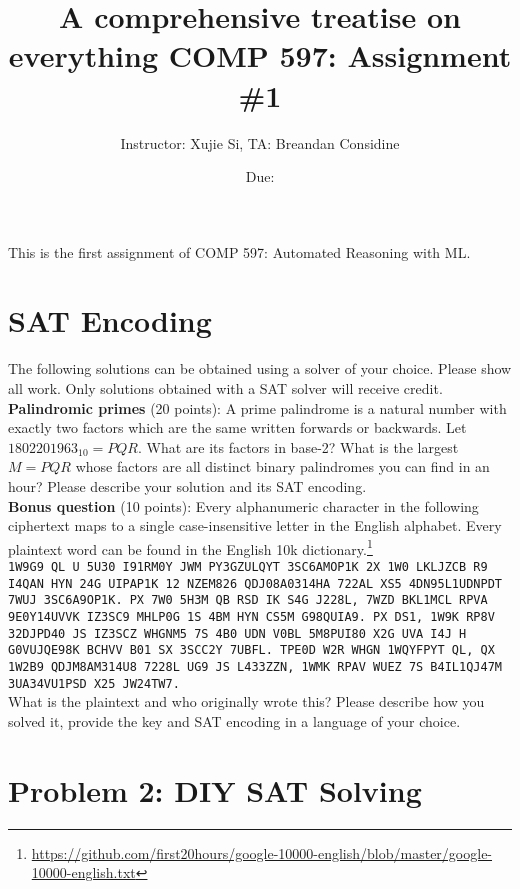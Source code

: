 \documentclass[11pt]{article}
\author{Instructor: Xujie Si, TA: Breandan Considine}
\date{Due: }
\title{A comprehensive treatise on everything\vspace{-2ex}%
}
\title{COMP 597: Assignment \#1}
\begin{document}
    \maketitle
    \noindent This is the first assignment of COMP 597: Automated Reasoning with ML.

    \section{SAT Encoding}

    The following solutions can be obtained using a solver of your choice. Please show all work. Only solutions obtained with a SAT solver will receive credit.\\

    \noindent \textbf{Palindromic primes} (20 points): A prime palindrome is a natural number with exactly two factors which are the same written forwards or backwards. Let $1802201963_{10} = PQR$. What are its factors in base-2? What is the largest $M=PQR$ whose factors are all distinct binary palindromes you can find in an hour? Please describe your solution and its SAT encoding.\\

    \noindent \textbf{Bonus question} (10 points): Every alphanumeric character in the following ciphertext maps to a single case-insensitive letter in the English alphabet. Every plaintext word can be found in the English 10k dictionary.\footnote{\url{https://github.com/first20hours/google-10000-english/blob/master/google-10000-english.txt}}\\

    \noindent \tiny\texttt{1W9G9 QL U 5U30 I91RM0Y JWM PY3GZULQYT 3SC6AMOP1K 2X 1W0 LKLJZCB R9 I4QAN HYN 24G UIPAP1K 12 NZEM826 QDJ08A0314HA 722AL XS5 4DN95L1UDNPDT 7WUJ 3SC6A9OP1K. PX 7W0 5H3M QB RSD IK S4G J228L, 7WZD BKL1MCL RPVA 9E0Y14UVVK IZ3SC9 MHLP0G 1S 4BM HYN CS5M G98QUIA9. PX DS1, 1W9K RP8V 32DJPD40 JS IZ3SCZ WHGNM5 7S 4B0 UDN V0BL 5M8PUI80 X2G UVA I4J H G0VUJQE98K BCHVV B01 SX 3SCC2Y 7UBFL. TPE0D W2R WHGN 1WQYFPYT QL, QX 1W2B9 QDJM8AM314U8 7228L UG9 JS L433ZZN, 1WMK RPAV WUEZ 7S B4IL1QJ47M 3UA34VU1PSD X25 JW24TW7.}\normalsize\\

    \noindent What is the plaintext and who originally wrote this? Please describe how you solved it, provide the key and SAT encoding in a language of your choice.

    \pagebreak\section{Problem 2: DIY SAT Solving}
\end{document}
